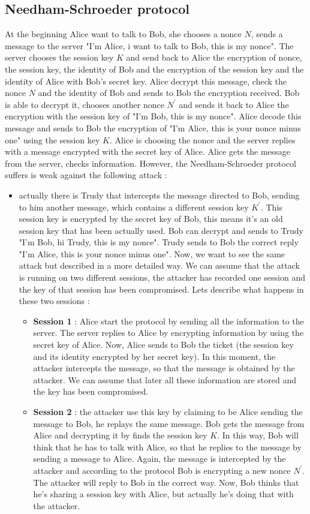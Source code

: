 \documentclass[11pt]{article}
\begin{document}
\subsection{Needham-Schroeder protocol}
At the beginning Alice want to talk to Bob, she chooses a nonce $N$, sends a message to the server "I'm Alice, i want to talk to Bob, this is my nonce". The server chooses the session key $K$ and send back to Alice the encryption of nonce, the session key, the identity of Bob and the encryption of the session key and the identity of Alice with Bob's secret key. Alice decrypt this message, check the nonce $N$ and the identity of Bob and sends to Bob the encryption received. Bob is able to decrypt it, chooses another nonce $N^{'}$ and sends it back to Alice the encryption with the session key of "I'm Bob, this is my nonce". Alice decode this message and sends to Bob the encryption of "I'm Alice, this is your nonce minus one" using the session key $K$. Alice is choosing the nonce and the server replies with a message encrypted with the secret key of Alice. Alice gets the message from the server, checks information. However, the Needham-Schroeder protocol suffers is weak against the following attack :
\begin{itemize}
\item actually there is Trudy that intercepts the message directed to Bob, sending to him another message, which contains a different session key $K^{'}$. This session key is encrypted by the secret key of Bob, this means it's an old session key that has been actually used. Bob can decrypt and sends to Trudy "I'm Bob, hi Trudy, this is my nonce". Trudy sends to Bob the correct reply "I'm Alice, this is your nonce minus one". Now, we want to see the same attack but described in a more detailed way. We can assume that the attack is running on two different sessions, the attacker has recorded one session and the key of that session has been compromised. Lets describe what happens in these two sessions :
\begin{itemize}
\item \textbf{Session 1} : Alice start the protocol by sending all the information to the server. The server replies to Alice by encrypting information by using the secret key of Alice. Now, Alice sends to Bob the ticket (the session key and its identity encrypted by her secret key). In this moment, the attacker intercepts the message, so that the message is obtained by the attacker. We can assume that later all these information are stored and the key has been compromised.
\item \textbf{Session 2} : the attacker use this key by claiming to be Alice sending the message to Bob, he replays the same message. Bob gets the message from Alice and decrypting it by finds the session key $K$. In this way, Bob will think that he has to talk with Alice, so that he replies to the message by sending a message to Alice. Again, the message is intercepted by the attacker and according to the protocol Bob is encrypting a new nonce $N^{'}$. The attacker will reply to Bob in the correct way. Now, Bob thinks that he's sharing a session key with Alice, but actually he's doing that with the attacker. 
\end{itemize}
\end{itemize}
\end{document}
